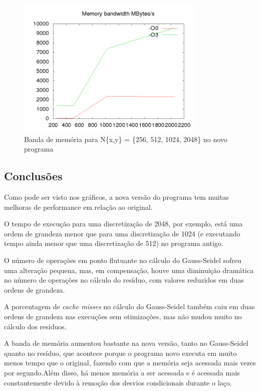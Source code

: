 \documentclass[12pt]{article}
\begin{document}
		\newpage
		\begin{figure}[ht!]
			\centering
			\includegraphics[width=90mm]{new_res_mem.png}
			\caption{Banda de memória para N\{x,y\} = \{256, 512, 1024, 2048\} no novo programa}
		\end{figure}
		\newpage
		
	\subsection{Conclusões}
	Como pode ser visto nos gráficos, a nova versão do programa tem muitas melhoras de performance em relação ao original.
	
	O tempo de execução para uma discretização de 2048, por exemplo, está uma ordem de grandeza menor que para uma discretização de 1024 (e executando tempo ainda menor que uma discretização de 512) no programa antigo.
	
	O número de operações em ponto flutuante no cálculo do Gauss-Seidel sofreu uma alteração pequena, mas, em compensação, houve uma diminuição dramática no número de operações no cálculo do resíduo, com valores reduzidos em duas ordens de grandeza.
	
	A porcentagem de \emph{cache misses} no cálculo do Gauss-Seidel também caiu em duas ordens de grandeza nas execuções sem otimizações, mas não mudou muito no cálculo dos resíduos.

	A banda de memória aumentou bastante na nova versão, tanto no Gauss-Seidel quanto no resíduo, que acontece porque o programa novo executa em muito menos tempo que o original, fazendo com que a memória seja acessada mais vezes por segundo.Além disso, há menos memória a ser acessada e é acessada mais constantemente devido à remoção dos desvios condicionais durante o laço.
	
\end{document}
